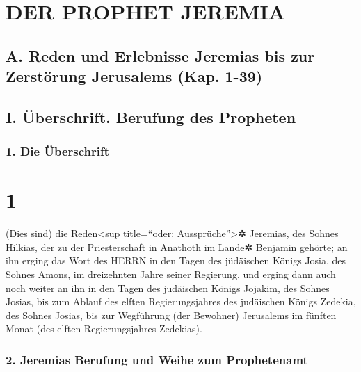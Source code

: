 \hypertarget{der-prophet-jeremia}{%
\section{DER PROPHET JEREMIA}\label{der-prophet-jeremia}}

\hypertarget{a.-reden-und-erlebnisse-jeremias-bis-zur-zerstuxf6rung-jerusalems-kap.-1-39}{%
\subsection{A. Reden und Erlebnisse Jeremias bis zur Zerstörung
Jerusalems (Kap.
1-39)}\label{a.-reden-und-erlebnisse-jeremias-bis-zur-zerstuxf6rung-jerusalems-kap.-1-39}}

\hypertarget{i.-uxfcberschrift.-berufung-des-propheten}{%
\subsection{I. Überschrift. Berufung des
Propheten}\label{i.-uxfcberschrift.-berufung-des-propheten}}

\hypertarget{die-uxfcberschrift}{%
\subsubsection{1. Die Überschrift}\label{die-uxfcberschrift}}

\hypertarget{section}{%
\section{1}\label{section}}

(Dies sind) die Reden\textless sup title=``oder:
Aussprüche''\textgreater✲ Jeremias, des Sohnes Hilkias, der zu der
Priesterschaft in Anathoth im Lande✲ Benjamin gehörte; an
ihn erging das Wort des HERRN in den Tagen des jüdäischen Königs Josia,
des Sohnes Amons, im dreizehnten Jahre seiner Regierung,
und erging dann auch noch weiter an ihn in den Tagen des
judäischen Königs Jojakim, des Sohnes Josias, bis zum Ablauf des elften
Regierungsjahres des judäischen Königs Zedekia, des Sohnes Josias, bis
zur Wegführung (der Bewohner) Jerusalems im fünften Monat (des elften
Regierungsjahres Zedekias).

\hypertarget{jeremias-berufung-und-weihe-zum-prophetenamt}{%
\subsubsection{2. Jeremias Berufung und Weihe zum
Prophetenamt}\label{jeremias-berufung-und-weihe-zum-prophetenamt}}

